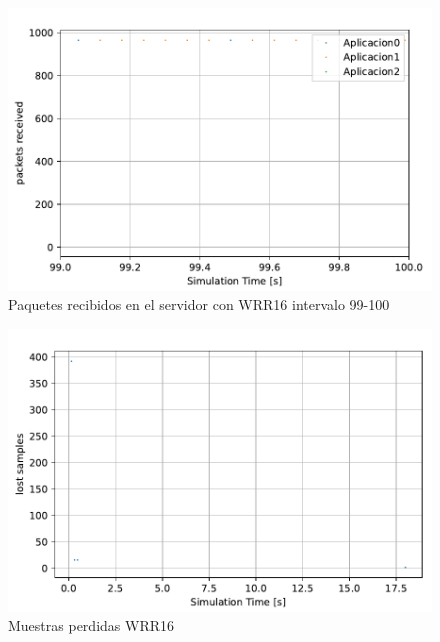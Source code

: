 \begin{figure}
    \centering
    \includegraphics{graficas/WRR/packetsReceived_WRR_99.pdf}
    \caption{Paquetes recibidos en el servidor con WRR16 intervalo 99-100}
    \label{fig:sinqos_pktreceived99100}
\end{figure}

\begin{figure}
    \centering
    \includegraphics{graficas/WRR/muestras_perdidas_wrr.pdf}
    \caption{Muestras perdidas WRR16}
    \label{fig:sinqos_pktreceived99100}
\end{figure}


